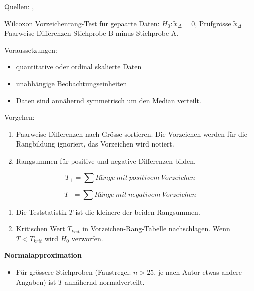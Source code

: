 \documentclass[
]{book}
\providecommand{\tightlist}{%
  \setlength{\itemsep}{0pt}\setlength{\parskip}{0pt}}
\begin{document}
Quellen: \citet{Leonhart2013}, \citet{Realstat}

Wilcoxon Vorzeichenrang-Test für gepaarte Daten: \(H_0: \tilde{x}_{\Delta} = 0\), Prüfgrösse
\(\tilde{x}_{\Delta}\) = Paarweise Differenzen Stichprobe B minus Stichprobe A.

Voraussetzungen:

\begin{itemize}
\tightlist
\item
  quantitative oder ordinal skalierte Daten\\
\item
  unabhängige Beobachtungseinheiten\\
\item
  Daten sind annähernd symmetrisch um den Median verteilt.
\end{itemize}

Vorgehen:

\begin{enumerate}
\def\labelenumi{\arabic{enumi}.}
\tightlist
\item
  Paarweise Differenzen nach Grösse sortieren. Die Vorzeichen werden für die Rangbildung ignoriert, das Vorzeichen wird notiert.\\
\item
  Rangsummen für positive und negative Differenzen bilden.
\end{enumerate}

\[T_+ = \sum Ränge ~mit ~positivem ~Vorzeichen\]

\[T_- = \sum Ränge ~mit ~negativem ~Vorzeichen\]

\begin{enumerate}
\def\labelenumi{\arabic{enumi}.}
\setcounter{enumi}{2}
\tightlist
\item
  Die Teststatistik \(T\) ist die kleinere der beiden Rangsummen.\\
\item
  Kritischen Wert \(T_{krit}\) in \href{https://www.real-statistics.com/statistics-tables/wilcoxon-signed-ranks-table/}{Vorzeichen-Rang-Tabelle} nachschlagen. Wenn \(T < T_{krit}\) wird \(H_0\) verworfen.
\end{enumerate}

\textbf{Normalapproximation}

\begin{itemize}
\tightlist
\item
  Für grössere Stichproben (Faustregel: \(n > 25\), je nach Autor etwas andere Angaben) ist \(T\) annähernd normalverteilt.
\end{itemize}
\end{document}
